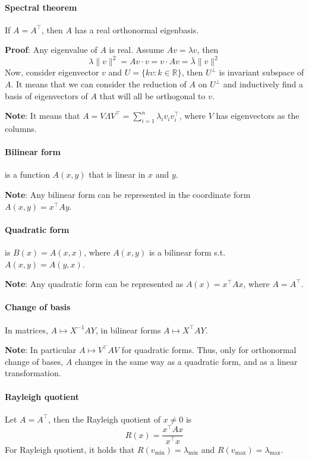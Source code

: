 \documentclass{article}
\begin{document}
\paragraph{Spectral theorem} If $A = A^\top$, then $A$ has a real orthonormal eigenbasis.

\textbf{Proof}: Any eigenvalue of $A$ is real. Assume $Av = \lambda v$, then
$$
\lambda \|v\|^2 = Av \cdot v = v \cdot Av = \bar \lambda \|v\|^2
$$
Now, consider eigenvector $v$ and $U = \{kv : k \in \mathbb R\}$, then $U^\perp$ is invariant subspace of $A$. It means that we can consider the reduction of $A$ on $U^\perp$ and inductively find a basis of eigenvectors of $A$ that will all be orthogonal to $v$.

\textbf{Note}: It means that $A = V \Lambda V^\top = \sum\limits_{i=1}^n \lambda_i v_i v_i^\top$, where $V$ has eigenvectors as the columns.

\paragraph{Bilinear form} is a function $A(x, y)$ that is linear in $x$ and $y$.

\textbf{Note}: Any bilinear form can be represented in the coordinate form $A(x, y) = x^\top Ay$.

\paragraph{Quadratic form} is $B(x) = A(x, x)$, where $A(x, y)$ is a bilinear form s.t. $A(x, y) = A(y, x)$.

\textbf{Note}: Any quadratic form can be represented as $A(x) = x^\top Ax$, where $A = A^\top$.

\paragraph{Change of basis} In matrices, $A \mapsto X^{-1} A Y$, in bilinear forms $A \mapsto X^\top A Y$.

\textbf{Note}: In particular $A \mapsto V^\top AV$ for quadratic forms. Thus, only for orthonormal change of bases, $A$ changes in the same way as a quadratic form, and as a linear transformation.

\paragraph{Rayleigh quotient} Let $A = A^\top$, then the Rayleigh quotient of $x \neq 0$ is
$$
R(x) = \frac{x^\top Ax}{x^\top x}
$$
For Rayleigh quotient, it holds that $R(v_{\min}) = \lambda_{\min}$ and $R(v_{\max}) = \lambda_{\max}$.
\end{document}
